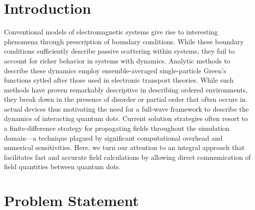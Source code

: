 \documentclass[conference]{IEEEtran}
\begin{document}
\IEEEpeerreviewmaketitle

\section{Introduction}
Conventional models of electromagnetic systems give rise to interesting phenomena through prescription of boundary conditions.
While these boundary conditions sufficiently describe passive scattering within systems, they fail to account for richer behavior in systems with dynamics.
Analytic methods to describe these dynamics employ ensemble-averaged single-particle Green's functions sytled after those used in electronic transport theories. 
While such methods have proven remarkably descriptive in describing ordered environments, they break down in the presence of disorder or partial order that often occurs in actual devices thus motivating the need for a full-wave framework to describe the dynamics of interacting quantum dots.
Current solution strategies often resort to a finite-difference strategy for propagating fields throughout the simulation domain---a technique plagued by significant computational overhead and numerical sensitivities.
Here, we turn our attention to an integral approach that facilitates fast and accurate field calculations by allowing direct communication of field quantities between quantum dots.


\section{Problem Statement}
\end{document}
